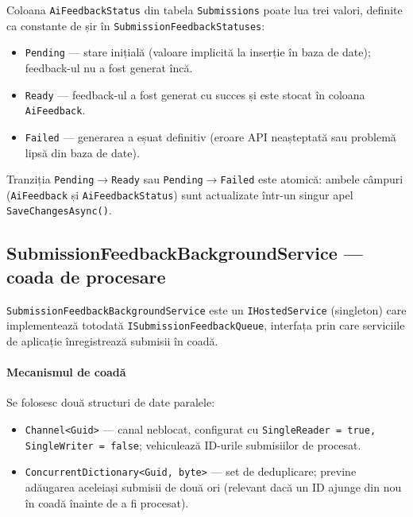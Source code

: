 Coloana \texttt{AiFeedbackStatus} din tabela \texttt{Submissions} poate
lua trei valori, definite ca constante de șir în
\texttt{SubmissionFeedbackStatuses}:

\begin{itemize}
  \item \texttt{Pending} — stare inițială (valoare implicită la inserție
        în baza de date); feedback-ul nu a fost generat încă.
  \item \texttt{Ready} — feedback-ul a fost generat cu succes și este
        stocat în coloana \texttt{AiFeedback}.
  \item \texttt{Failed} — generarea a eșuat definitiv (eroare API
        neașteptată sau problemă lipsă din baza de date).
\end{itemize}

Tranziția \texttt{Pending}$\rightarrow$\texttt{Ready} sau \texttt{Pending}$\rightarrow$\texttt{Failed}
este atomică: ambele câmpuri (\texttt{AiFeedback} și \texttt{AiFeedbackStatus})
sunt actualizate într-un singur apel \texttt{SaveChangesAsync()}.

\subsection{SubmissionFeedbackBackgroundService — coada de procesare}

\texttt{SubmissionFeedbackBackgroundService} este un
\texttt{IHostedService} (singleton) care implementează totodată
\texttt{ISubmissionFeedbackQueue}, interfața prin care serviciile de
aplicație înregistrează submisii în coadă.

\paragraph{Mecanismul de coadă}
Se folosesc două structuri de date paralele:
\begin{itemize}
  \item \texttt{Channel<Guid>} — canal neblocat, configurat cu
        \texttt{SingleReader = true, SingleWriter = false}; vehiculează
        ID-urile submisiilor de procesat.
  \item \texttt{ConcurrentDictionary<Guid, byte>} — set de deduplicare;
        previne adăugarea aceleiași submisii de două ori (relevant dacă
        un ID ajunge din nou în coadă înainte de a fi procesat).
\end{itemize}

